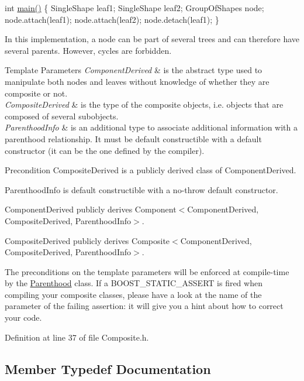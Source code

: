 int \hyperlink{main_8cpp_a3c04138a5bfe5d72780bb7e82a18e627}{main()} \{ Single\+Shape leaf1; Single\+Shape leaf2; Group\+Of\+Shapes node; node.\+attach(leaf1); node.\+attach(leaf2); node.\+detach(leaf1); \} 

In this implementation, a node can be part of several trees and can therefore have several parents. However, cycles are forbidden.


\begin{DoxyTemplParams}{Template Parameters}
{\em Component\+Derived} & is the abstract type used to manipulate both nodes and leaves without knowledge of whether they are composite or not. \\
\hline
{\em Composite\+Derived} & is the type of the composite objects, i.\+e. objects that are composed of several subobjects. \\
\hline
{\em Parenthood\+Info} & is an additional type to associate additional information with a parenthood relationship. It must be default constructible with a default constructor (it can be the one defined by the compiler).\\
\hline
\end{DoxyTemplParams}
\begin{DoxyPrecond}{Precondition}
Composite\+Derived is a publicly derived class of Component\+Derived. 

Parenthood\+Info is default constructible with a no-\/throw default constructor. 

Component\+Derived publicly derives Component$<$\+Component\+Derived, Composite\+Derived, Parenthood\+Info$>$. 

Composite\+Derived publicly derives Composite$<$\+Component\+Derived, Composite\+Derived, Parenthood\+Info$>$.
\end{DoxyPrecond}
The preconditions on the template parameters will be enforced at compile-\/time by the \hyperlink{classocra_1_1Parenthood}{Parenthood} class. If a B\+O\+O\+S\+T\+\_\+\+S\+T\+A\+T\+I\+C\+\_\+\+A\+S\+S\+E\+RT is fired when compiling your composite classes, please have a look at the name of the parameter of the failing assertion\+: it will give you a hint about how to correct your code. 

Definition at line 37 of file Composite.\+h.



\subsection{Member Typedef Documentation}
